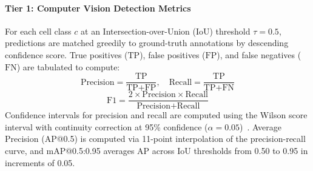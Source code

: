 \documentclass[10pt,conference]{IEEEtran}
\begin{document}
\paragraph{Tier 1: Computer Vision Detection Metrics}
For each cell class $c$ at an Intersection-over-Union (IoU) threshold $\tau = 0.5$, predictions are matched greedily to ground-truth annotations by descending confidence score. True positives ($\text{TP}$), false positives ($\text{FP}$), and false negatives ($\text{FN}$) are tabulated to compute:
\begin{equation}
\text{Precision} = \frac{\text{TP}}{\text{TP} + \text{FP}}, \quad \text{Recall} = \frac{\text{TP}}{\text{TP} + \text{FN}}
\end{equation}
\begin{equation}
\text{F1} = \frac{2 \times \text{Precision} \times \text{Recall}}{\text{Precision} + \text{Recall}}
\end{equation}
Confidence intervals for precision and recall are computed using the Wilson score interval with continuity correction at 95\% confidence ($\alpha = 0.05$)~\cite{wilson1927}. Average Precision (AP@0.5) is computed via 11-point interpolation of the precision-recall curve, and mAP@0.5:0.95 averages AP across IoU thresholds from 0.50 to 0.95 in increments of 0.05.
\end{document}
